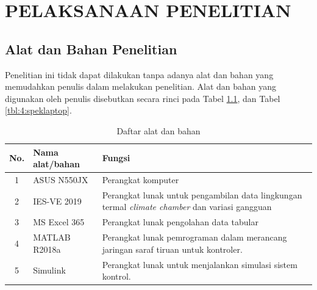 \chapter{PELAKSANAAN PENELITIAN}
\label{pelaksanaan-penelitian}

\section{Alat dan Bahan Penelitian}
Penelitian ini tidak dapat dilakukan tanpa adanya alat dan bahan yang memudahkan penulis dalam melakukan penelitian. Alat dan bahan yang digunakan oleh penulis disebutkan secara rinci pada Tabel \ref{tbl:4:alatbahan}, dan Tabel \ref{tbl:4:speklaptop}.

\vspace{2em}
\begin{table}[!h]
	\caption{Daftar alat dan bahan}
	\label{tbl:4:alatbahan}
	\centering
	\begin{tabular}{|c|p{3.6cm}|p{9cm}|}
		\hline
		No. & Nama alat/bahan & Fungsi \\
		\hline
		1 & ASUS N550JX & Perangkat komputer \\ \hline
		2 & IES-VE 2019 & Perangkat lunak untuk pengambilan data lingkungan termal \textit{climate chamber} dan variasi gangguan \\ \hline
		3 & MS Excel 365 & Perangkat lunak pengolahan data tabular \\ \hline
		4 & MATLAB R2018a & Perangkat lunak pemrograman dalam merancang jaringan saraf tiruan untuk kontroler. \\ \hline
		5 & Simulink & Perangkat lunak untuk menjalankan simulasi sistem kontrol. \\ \hline
	\end{tabular}
\end{table}

